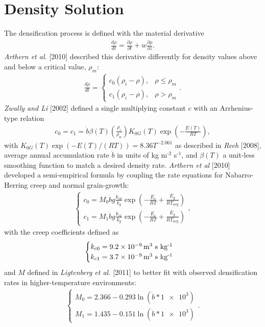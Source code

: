 \documentclass{article}%
\newcommand{\sups}[1]{\ensuremath{^{\textrm{#1}}}}
\begin{document}
\section{Density Solution}

The densification process is defined with the material derivative
\begin{align*}
  \frac{d \rho}{dt} = \frac{\partial \rho}{\partial t} + 
  w\frac{\partial \rho}{\partial z}.
\end{align*}
\emph{Arthern et al.} [2010] described this derivative differently for density values above and below a critical value, $\rho_m$:  
\begin{align*}
  \frac{d \rho}{dt} = 
  \begin{cases}
   c_0(\rho_i - \rho), &\rho \leq \rho_m\\
   c_1(\rho_i - \rho), &\rho > \rho_m
  \end{cases}.
\end{align*}
\emph{Zwally and Li} [2002] defined a single multiplying constant $c$ with an Arrhenius-type relation
\begin{align*}
  c_0 = c_1 = 
  \dot{b} \beta(T)\left(\frac{\rho_i}{\rho_w}\right)
  K_{0G}(T)\exp \left( -\frac{E(T)}{RT} \right),
\end{align*}
with $K_{0G}(T) \exp(-E(T)/(RT)) = 8.36T^{-2.061}$ as described in \emph{Reeh} [2008], average annual accumulation rate $\dot{b}$ in units of kg m\sups{-2} s\sups{-1}, and $\beta(T)$ a unit-less smoothing function to match a desired density rate.  \emph{Arthern et al} [2010] developed a semi-empirical formula by coupling the rate equations for Nabarro-Herring creep and normal grain-growth: 
\begin{align*}
  \begin{cases}
    c_0 = M_0 \dot{b}g\frac{k_{c0}}{k_g}\exp\left(-\frac{E_c}{RT} + 
          \frac{E_g}{RT_{avg}}\right)\\
    c_1 = M_1 \dot{b}g\frac{k_{c1}}{k_g}\exp\left(-\frac{E_c}{RT} + 
          \frac{E_g}{RT_{avg}}\right)
  \end{cases},
\end{align*}
with the creep coefficients defined as
\begin{align*}
  \begin{cases}
    k_{c0} = \text{\SI{9.2e-9} m\sups{3} s kg\sups{-1}} \\
    k_{c1} = \text{\SI{3.7e-9} m\sups{3} s kg\sups{-1}}  
  \end{cases}
\end{align*}
and $M$ defined in \emph{Ligtenberg et al.} [2011] to better fit with observed densification rates in higher-temperature environments:
\begin{align*}
  \begin{cases}
    M_0 = 2.366 - 0.293\ln(\dot{b}*\SI{1e3})\\
    M_1 = 1.435 - 0.151\ln(\dot{b}*\SI{1e3})
  \end{cases}.
\end{align*}
\end{document}

